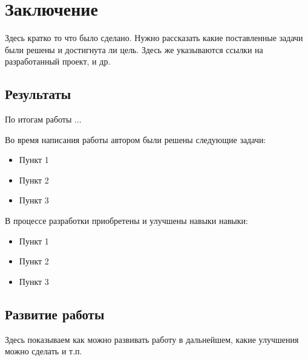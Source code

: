 \section{Заключение}

Здесь кратко то что было сделано. Нужно рассказать какие поставленные задачи были решены и достигнута ли цель. Здесь же указываются ссылки на разработанный проект, и др.

\subsection{Результаты}
По итогам работы ...

Во время написания работы автором были решены следующие задачи:
\begin{itemize}
    \item Пункт 1
    \item Пункт 2
    \item Пункт 3
\end{itemize}

В процессе разработки приобретены и улучшены навыки навыки:
\begin{itemize}
    \item Пункт 1
    \item Пункт 2
    \item Пункт 3
\end{itemize}

\subsection{Развитие работы}

Здесь показываем как можно развивать работу в дальнейшем, какие улучшения можно сделать и т.п.
